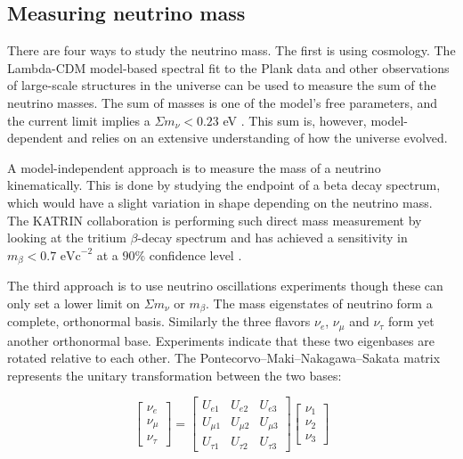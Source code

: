 \subsection{Measuring neutrino mass}

There are four ways to study the neutrino mass. The first is using cosmology. The Lambda-CDM model-based spectral fit to the Plank data and other observations of large-scale structures in the universe can be used to measure the sum of the neutrino masses. The sum of masses is one of the model's free parameters, and the current limit implies a $\Sigma m_\nu<0.23$ eV \cite{Planck_2015fie}. This sum is, however, model-dependent and relies on an extensive understanding of how the universe evolved. 

A model-independent approach is to measure the mass of a neutrino kinematically. This is done by studying the endpoint of a beta decay spectrum, which would have a slight variation in shape depending on the neutrino mass. The KATRIN collaboration is performing such direct mass measurement by looking at the tritium $\beta$-decay spectrum and has achieved a sensitivity in $m_\beta < 0.7 \text{ eVc}^{-2}$ at a $90\%$ confidence level \cite{KATRIN:2022}.


The third approach is to use neutrino oscillations experiments though these can only set a lower limit on $\Sigma m_\nu$ or $m_\beta$. The mass eigenstates of neutrino form a complete, orthonormal basis. Similarly the three flavors $\nu_e$, $\nu_\mu$ and $\nu_\tau$ form yet another orthonormal base. Experiments indicate that these two eigenbases are rotated relative to each other. The Pontecorvo–Maki–Nakagawa–Sakata matrix represents the unitary transformation between the two bases:

\begin{equation}\label{pmns_matrix}
\begin{bmatrix} \nu_e \\ \nu_\mu \\ \nu_\tau \end{bmatrix} = \begin{bmatrix} U_{e1} & U_{e2} & U_{e3}\\ U_{\mu 1} & U_{\mu 2} & U_{\mu 3} \\ U_{\tau 1} & U_{\tau 2} & U_{\tau 3} \end{bmatrix} \begin{bmatrix} \nu_1 \\ \nu_2 \\ \nu_3 \end{bmatrix}
\end{equation}

